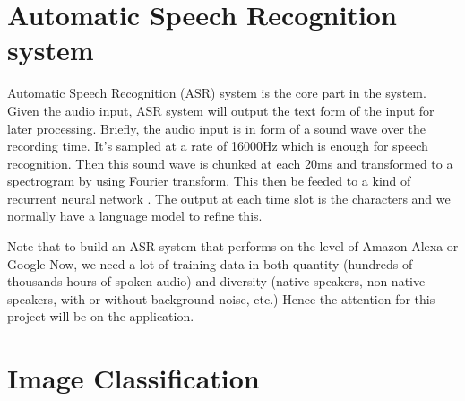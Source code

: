 \section{Automatic Speech Recognition system}
Automatic Speech Recognition (ASR) system is the core part in the system. Given the audio input, ASR system will output the text form of the input for later processing. Briefly, the audio input is in form of a sound wave over the recording time. It's sampled at a rate of 16000Hz which is enough for speech recognition. Then this sound wave is chunked at each 20ms and transformed to a spectrogram by using Fourier transform. This then be feeded to a kind of recurrent neural network \cite{Medium:2016}. The output at each time slot is the characters and we normally have a language model to refine this. 

Note that to build an ASR system that performs on the level of Amazon Alexa or Google Now, we need a lot of training data in both quantity (hundreds of thousands hours of spoken audio) and diversity (native speakers, non-native speakers, with or without background noise, etc.) Hence the attention for this project will be on the application.


\section{Image Classification}
